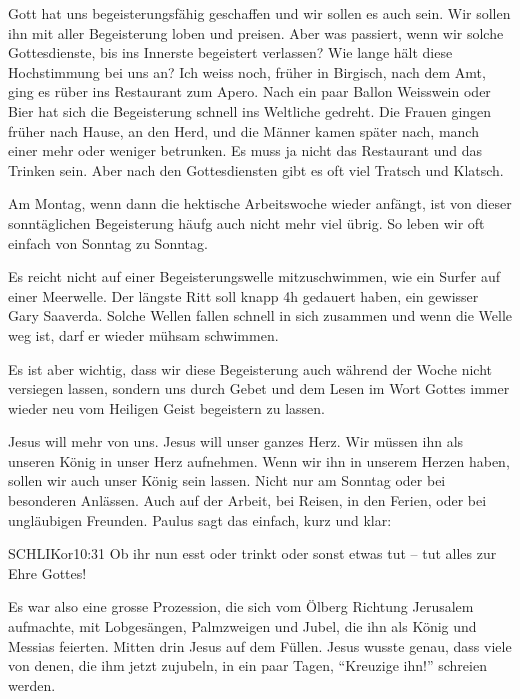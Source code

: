 \documentclass[fontsize=16pt]{mybib}
\begin{document}
    Gott hat uns begeisterungsfähig geschaffen und wir sollen es auch sein. Wir sollen ihn mit aller Begeisterung loben und preisen. Aber was passiert, wenn wir solche Gottesdienste, bis ins Innerste begeistert verlassen? Wie lange hält diese Hochstimmung bei uns an? Ich weiss noch, früher in Birgisch, nach dem Amt, ging es rüber ins Restaurant zum Apero. Nach ein paar Ballon Weisswein oder Bier hat sich die Begeisterung schnell ins Weltliche gedreht. Die Frauen gingen früher nach Hause, an den Herd, und die Männer kamen später nach, manch einer mehr oder weniger betrunken. Es muss ja nicht das Restaurant und das Trinken sein. Aber nach den Gottesdiensten gibt es oft viel Tratsch und Klatsch.

    Am Montag, wenn dann die hektische Arbeitswoche wieder anfängt, ist von dieser sonntäglichen Begeisterung häufg auch nicht mehr viel übrig. So leben wir oft einfach von Sonntag zu Sonntag. 

    Es reicht nicht auf einer Begeisterungswelle mitzuschwimmen, wie ein Surfer auf einer Meerwelle. Der längste Ritt soll knapp 4h gedauert haben, ein gewisser Gary Saaverda. Solche Wellen fallen schnell in sich zusammen und wenn die Welle weg ist, darf er wieder mühsam schwimmen.

    Es ist aber wichtig, dass wir diese Begeisterung auch während der Woche nicht versiegen lassen, sondern uns durch Gebet und dem Lesen im Wort Gottes immer wieder neu vom Heiligen Geist begeistern zu lassen.
    
    Jesus will mehr von uns. Jesus will unser ganzes Herz. Wir müssen ihn als unseren König in unser Herz aufnehmen. Wenn wir ihn in unserem Herzen haben, sollen wir auch unser König sein lassen. Nicht nur am Sonntag oder bei besonderen Anlässen. Auch auf der Arbeit, bei Reisen, in den Ferien, oder bei ungläubigen Freunden. Paulus sagt das einfach, kurz und klar:
    \begin{bibelbox}{SCHL}{IKor}{10:31}
    Ob ihr nun esst oder trinkt oder sonst etwas tut -- tut alles zur Ehre Gottes!
    \end{bibelbox}

    Es war also eine grosse Prozession, die sich vom Ölberg Richtung Jerusalem aufmachte, mit Lobgesängen, Palmzweigen und Jubel, die ihn als König und Messias feierten. Mitten drin Jesus auf dem Füllen. Jesus wusste genau, dass viele von denen, die ihm jetzt zujubeln, in ein paar Tagen, \enquote{Kreuzige ihn!} schreien werden.
\end{document}
